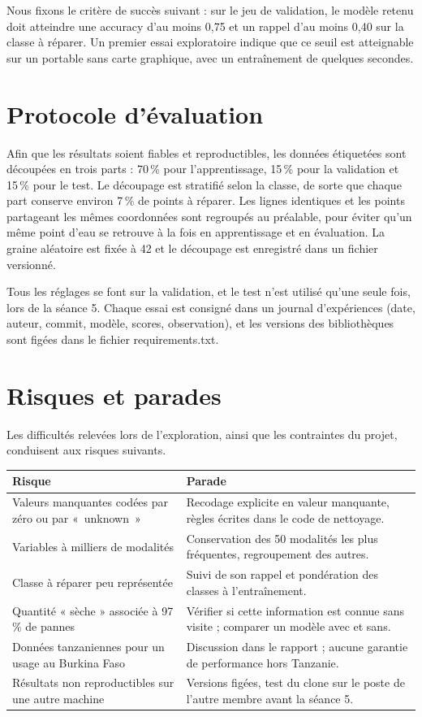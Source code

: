 \documentclass[10pt,a4paper]{article}
\begin{document}
Nous fixons le critère de succès suivant : sur le jeu de validation, le modèle retenu doit atteindre une accuracy d'au moins 0,75 et un rappel d'au moins 0,40 sur la classe à réparer. Un premier essai exploratoire indique que ce seuil est atteignable sur un portable sans carte graphique, avec un entraînement de quelques secondes.

\section{Protocole d'évaluation}
Afin que les résultats soient fiables et reproductibles, les données étiquetées sont découpées en trois parts : 70\,\% pour l'apprentissage, 15\,\% pour la validation et 15\,\% pour le test. Le découpage est stratifié selon la classe, de sorte que chaque part conserve environ 7\,\% de points à réparer. Les lignes identiques et les points partageant les mêmes coordonnées sont regroupés au préalable, pour éviter qu'un même point d'eau se retrouve à la fois en apprentissage et en évaluation. La graine aléatoire est fixée à 42 et le découpage est enregistré dans un fichier versionné.

Tous les réglages se font sur la validation, et le test n'est utilisé qu'une seule fois, lors de la séance 5. Chaque essai est consigné dans un journal d'expériences (date, auteur, commit, modèle, scores, observation), et les versions des bibliothèques sont figées dans le fichier requirements.txt.

\section{Risques et parades}
Les difficultés relevées lors de l'exploration, ainsi que les contraintes du projet, conduisent aux risques suivants.

\begin{tabularx}{\textwidth}{@{}>{\raggedright\arraybackslash}p{6.4cm}L@{}}
\toprule
Risque & Parade \\
\midrule
Valeurs manquantes codées par zéro ou par \mbox{« unknown »} & Recodage explicite en valeur manquante, règles écrites dans le code de nettoyage. \\
Variables à milliers de modalités & Conservation des 50 modalités les plus fréquentes, regroupement des autres. \\
Classe à réparer peu représentée & Suivi de son rappel et pondération des classes à l'entraînement. \\
Quantité « sèche » associée à 97\,\% de pannes & Vérifier si cette information est connue sans visite ; comparer un modèle avec et sans. \\
Données tanzaniennes pour un usage au Burkina Faso & Discussion dans le rapport ; aucune garantie de performance hors Tanzanie. \\
Résultats non reproductibles sur une autre machine & Versions figées, test du clone sur le poste de l'autre membre avant la séance 5. \\
\bottomrule
\end{tabularx}
\end{document}
